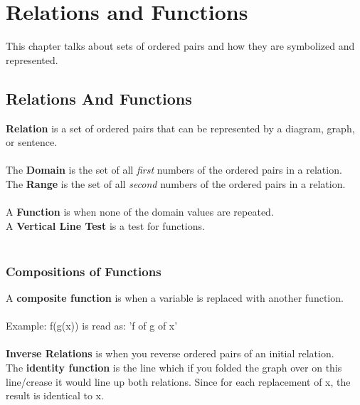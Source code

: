 \chapter{Relations and Functions}
This chapter talks about sets of ordered pairs and how they are symbolized and represented.
\section{Relations And Functions}

\textbf{Relation} is a set of ordered pairs that can be represented by a diagram, graph, or sentence.\\
\\
The \textbf{Domain} is the set of all \textit{first} numbers of the ordered pairs in a relation.\\
The \textbf{Range} is the set of all \textit{second} numbers of the ordered pairs in a relation. \\
\\
A \textbf{Function} is when none of the domain values are repeated.\\
A \textbf{Vertical Line Test} is a test for functions.\\
\\
\subsection{Compositions of Functions}
A \textbf{composite function} is when a variable is replaced with another function.\\
\\
Example: f(g(x)) is read as: 'f of g of x'\\
\\
\textbf{Inverse Relations} is when you reverse ordered pairs of an initial relation.\\
The \textbf{identity function} is the line which if you folded the graph over on this line/crease it would line up both relations. Since for each replacement of x, the result is identical to x.

\begin{center}
\end{center}

